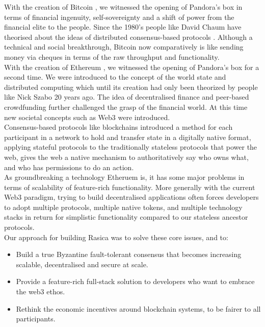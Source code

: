 With the creation of Bitcoin \cite{nakamoto2008bitcoin}, we witnessed the opening of Pandora's box in terms of financial ingenuity, self-sovereignty and a shift of power from the financial elite to the people. Since the 1980's people like David Chaum have theorised about the ideas of distributed consensus-based protocols \cite{chaum1979computer}. Although a technical and social breakthrough, Bitcoin now comparatively is like sending money via cheques in terms of the raw throughput and functionality. \\

With the creation of Ethereum \cite{wood2014ethereum}, we witnessed the opening of Pandora's box for a second time. We were introduced to the concept of the world state and distributed computing which until its creation had only been theorized by people like Nick Szabo 20 years ago. The idea of decentralised finance and peer-based crowdfunding further challenged the grasp of the financial world. At this time new societal concepts such as Web3 were introduced. \\

Consensus-based protocols like blockchains introduced a method for each participant in a network to hold and transfer state in a digitally native format, applying stateful protocols to the traditionally stateless protocols that power the web, gives the web a native mechanism to authoritatively say who owns what, and who has permissions to do an action. \\

As groundbreaking a technology Etheruem is, it has some major problems in terms of scalability of feature-rich functionality. More generally with the current Web3 paradigm, trying to build decentralised applications often forces developers to adopt multiple protocols, multiple native tokens, and multiple technology stacks in return for simplistic functionality compared to our stateless ancestor protocols. \\

Our approach for building Rasica was to solve these core issues, and to:

\begin{itemize}
\item Build a true Byzantine fault-tolerant consensus that becomes increasing scalable, decentralised and secure at scale.
\item Provide a feature-rich full-stack solution to developers who want to embrace the web3 ethos.
\item Rethink the economic incentives around blockchain systems, to be fairer to all participants.
\end{itemize}


